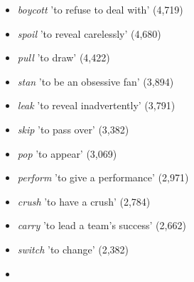 \documentclass[output=paper]{langscibook}
\begin{document}
\begin{itemize}
\begin{styleListParagraph}
\end{styleListParagraph}
\item \begin{styleListParagraph}
\textit{boycott} {}'to refuse to deal with' (4,719)
\end{styleListParagraph}
\item \begin{styleListParagraph}
\textit{spoil} {}'to reveal carelessly' (4,680)
\end{styleListParagraph}
\item \begin{styleListParagraph}
\textit{pull} 'to draw' (4,422)
\end{styleListParagraph}
\item \begin{styleListParagraph}
\textit{stan} 'to be an obsessive fan' (3,894)
\end{styleListParagraph}
\item \begin{styleListParagraph}
\textit{leak} 'to reveal inadvertently' (3,791)
\end{styleListParagraph}
\item \begin{styleListParagraph}
\textit{skip} 'to pass over' (3,382)
\end{styleListParagraph}
\item \begin{styleListParagraph}
\textit{pop} 'to appear' (3,069)
\end{styleListParagraph}
\item \begin{styleListParagraph}
\textit{perform} 'to give a performance' (2,971)
\end{styleListParagraph}
\item \begin{styleListParagraph}
\textit{crush} 'to have a crush' (2,784)
\end{styleListParagraph}
\item \begin{styleListParagraph}
\textit{carry} 'to lead a team's success' (2,662)
\end{styleListParagraph}
\item \begin{styleListParagraph}
\textit{switch} 'to change' (2,382)
\end{styleListParagraph}
\item \begin{styleListParagraph}

\end{styleListParagraph}
\end{itemize}
\end{document}
